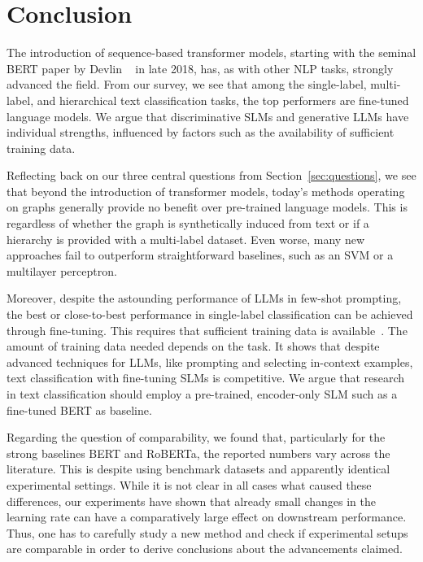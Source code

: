 \documentclass[lettersize,journal]{IEEEtran}
\newcommand{\SLM}{SLM\xspace}
\newcommand{\SLMs}{SLMs\xspace}
\newcommand{\LLMs}{LLMs\xspace}
\begin{document}
\section{Conclusion}
The introduction of sequence-based transformer models, starting with the seminal BERT paper by Devlin \etal~\cite{DBLP:conf/naacl/DevlinCLT19} in late 2018, has, as with other NLP tasks, strongly advanced the field. 
From our survey, we see that among the single-label, multi-label, and hierarchical text classification tasks, the top performers are fine-tuned language models.
We argue that discriminative \SLMs and generative \LLMs have individual strengths, influenced by factors such as the availability of sufficient training data.

Reflecting back on our three central questions from Section~\ref{sec:questions}, we see that beyond the introduction of transformer models, today's methods operating on graphs generally provide no benefit over pre-trained language models.
This is regardless of whether the graph is synthetically induced from text or if a hierarchy is provided with a multi-label dataset.
Even worse, many new approaches fail to outperform straightforward baselines, such as an SVM or a multilayer perceptron.

Moreover, despite the astounding performance of \LLMs in few-shot prompting, the best or close-to-best performance in single-label classification can be achieved through fine-tuning.
This requires that sufficient training data is available~\cite{DBLP:conf/emnlp/PecherSB25-100-samples}.
The amount of training data needed depends on the task. 
It shows that despite advanced techniques for \LLMs, like prompting and selecting in-context examples, text classification with fine-tuning \SLMs is competitive.
We argue that research in text classification should employ a pre-trained, encoder-only \SLM such as a fine-tuned BERT as baseline. 

Regarding the question of comparability, we found that, particularly for the strong baselines BERT and RoBERTa, the reported numbers vary across the literature.
This is despite using benchmark datasets and apparently identical experimental settings.
While it is not clear in all cases what caused these differences, our experiments have shown that already small changes in the learning rate can have a comparatively large effect on downstream performance.
Thus, one has to carefully study a new method and check if experimental setups are comparable in order to derive conclusions about the advancements claimed.
\end{document}
